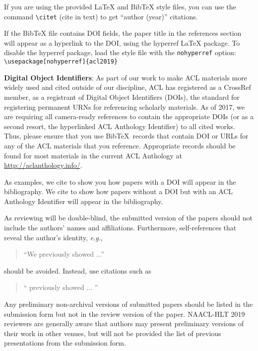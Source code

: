 \documentclass[11pt,a4paper]{article}
\begin{document}
If you are using the provided \LaTeX{} and Bib\TeX{} style files, you
can use the command \verb|\citet| (cite in text)
to get ``author (year)'' citations.

If the Bib\TeX{} file contains DOI fields, the paper
title in the references section will appear as a hyperlink
to the DOI, using the hyperref \LaTeX{} package.
To disable the hyperref package, load the style file
with the \verb|nohyperref| option: \\{\small
\verb|\usepackage[nohyperref]{acl2019}|}


\textbf{Digital Object Identifiers}:  As part of our work to make ACL
materials more widely used and cited outside of our discipline, ACL
has registered as a CrossRef member, as a registrant of Digital Object
Identifiers (DOIs), the standard for registering permanent URNs for
referencing scholarly materials.  As of 2017, we are requiring all
camera-ready references to contain the appropriate DOIs (or as a
second resort, the hyperlinked ACL Anthology Identifier) to all cited
works.  Thus, please ensure that you use Bib\TeX\ records that contain
DOI or URLs for any of the ACL materials that you reference.
Appropriate records should be found for most materials in the current
ACL Anthology at \url{http://aclanthology.info/}.

As examples, we cite \cite{P16-1001} to show you how papers with a DOI
will appear in the bibliography.  We cite \cite{C14-1001} to show how
papers without a DOI but with an ACL Anthology Identifier will appear
in the bibliography.  

As reviewing will be double-blind, the submitted version of the papers
should not include the authors' names and affiliations. Furthermore,
self-references that reveal the author's identity, {\em e.g.},
\begin{quote}
``We previously showed \cite{Gusfield:97} ...''  
\end{quote}
should be avoided. Instead, use citations such as 
\begin{quote}
``\citeauthor{Gusfield:97} 
previously showed ... ''
\end{quote}

Any preliminary non-archival versions of submitted papers should be listed in the submission form but not in the review version of the paper. NAACL-HLT 2019 reviewers are generally aware that authors may present preliminary versions of their work in other venues, but will not be provided the list of previous presentations from the submission form. 
\end{document}
